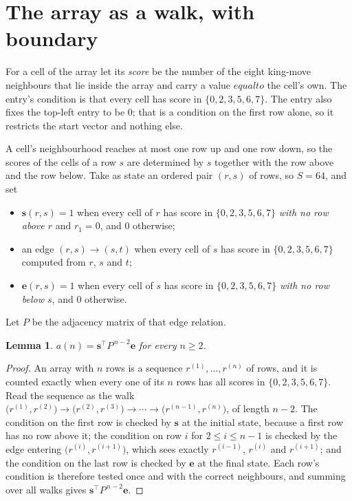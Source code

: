 \documentclass[11pt,a4paper]{article}
\theoremstyle{plain}
\newtheorem{lemma}[theorem]{Lemma}
\theoremstyle{definition}
\begin{document}
\section{The array as a walk, with boundary}

For a cell of the array let its \emph{score} be the number of the eight king-move neighbours that lie inside
the array and carry a value $equal to$ the cell's own. The entry's condition is that every cell
has score in $\{0,2,3,5,6,7\}$. The entry also fixes the top-left entry to be $0$; that is a condition on the first row alone, so it restricts the start vector and nothing else.

A cell's neighbourhood reaches at most one row up and one row down, so the scores of the
cells of a row $s$ are determined by $s$ together with the row above and the row below.
Take as state an ordered pair $(r,s)$ of rows, so $S=64$, and set
\begin{itemize}
\item $\mathbf{s}(r,s)=1$ when every cell of $r$ has score in $\{0,2,3,5,6,7\}$ \emph{with no row
above $r$} and $r_1=0$, and $0$ otherwise;
\item an edge $(r,s)\to(s,t)$ when every cell of $s$ has score in $\{0,2,3,5,6,7\}$ computed from
$r$, $s$ and $t$;
\item $\mathbf{e}(r,s)=1$ when every cell of $s$ has score in $\{0,2,3,5,6,7\}$ \emph{with no row
below $s$}, and $0$ otherwise.
\end{itemize}
Let $P$ be the adjacency matrix of that edge relation.

\begin{lemma}\label{lem:walk}
$a(n)=\mathbf{s}^{\!\top}P^{\,n-2}\mathbf{e}$ for every $n\ge2$.
\end{lemma}

\begin{proof}
An array with $n$ rows is a sequence $r^{(1)},\dots,r^{(n)}$ of rows, and it is counted
exactly when every one of its $n$ rows has all scores in $\{0,2,3,5,6,7\}$. Read the sequence as the
walk $\bigl(r^{(1)},r^{(2)}\bigr)\to\bigl(r^{(2)},r^{(3)}\bigr)\to\cdots\to
\bigl(r^{(n-1)},r^{(n)}\bigr)$, of length $n-2$. The condition on the first row is
checked by $\mathbf{s}$ at the initial state, because a first row has no row above it; the
condition on row $i$ for $2\le i\le n-1$ is checked by the edge entering
$\bigl(r^{(i)},r^{(i+1)}\bigr)$, which sees exactly $r^{(i-1)}$, $r^{(i)}$ and
$r^{(i+1)}$; and the condition on the last row is checked by $\mathbf{e}$ at the final
state. Each row's condition is therefore tested once and with the correct neighbours, and
summing over all walks gives $\mathbf{s}^{\!\top}P^{\,n-2}\mathbf{e}$.
\end{proof}
\end{document}
